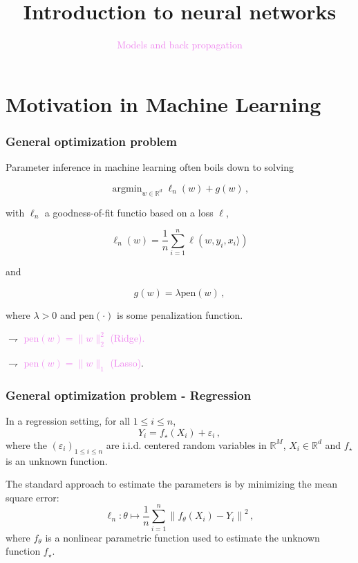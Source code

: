 \documentclass[9pt]{beamer}
\title{Introduction to neural networks}
\author{}
\date{}
\DeclareMathOperator*{\argmin}{argmin}%
\DeclareMathOperator{\pen}{pen}
\newcommand\R{\mathds{R}}
\renewcommand\pen{\textrm{pen}}
\begin{document}
\author[S. Le Corff]{\textcolor{violet}{Models and back propagation}\\ {\em {\small \textcolor{violet}{}}}}

\begin{frame}
  \titlepage
\end{frame}


 \section{Motivation in Machine Learning}


\begin{frame}
	\frametitle{General optimization problem}
	
\alert{Parameter inference in machine learning} often boils down to solving

\begin{equation*}
\argmin_{w \in \R^d} \ell_n(w) + g(w)\,,
\end{equation*}

with $\ell_n$ a \alert{goodness-of-fit functio  based on a loss $\ell$},

\begin{equation*}
\ell_n(w) = \frac 1n \sum_{i=1}^n \ell(w,y_i,  x_i \rangle)
\end{equation*}

 and

\begin{equation*}
g(w) = \lambda \pen(w)\,,
\end{equation*}

where $\lambda>0$ and \alert{$\pen(\cdot)$ is some penalization function}.


$\rightharpoondown$ \textcolor{violet}{$\pen(w) =  \|w\|_2^2$ (Ridge).}

$\rightharpoondown$ \textcolor{violet}{$\pen(w) = \|w\|_1$ (Lasso)}.


\end{frame}


\begin{frame}
	\frametitle{General optimization problem - Regression}
	
In a regression setting, for all $1\leqslant i \leqslant n$, 
$$
Y_i = f_\star(X_i) + \varepsilon_i\,,
$$
where the $(\varepsilon_i)_{1\leqslant i\leqslant n}$ are i.i.d. centered random variables in $\mathbb{R}^M$, $X_i\in\mathbb{R}^d$ and \alert{$f_{\star}$ is an unknown function}.  

\vspace{.2cm}

The standard approach to estimate the parameters is by \alert{minimizing the mean square error}:
$$
\ell_n:\theta \mapsto  \frac{1}{n} \sum_{i=1}^n\left\|f_{\theta}(X_i) - Y_i\right\|^2\,,
$$
where \alert{$f_{\theta}$ is a nonlinear parametric function} used to estimate the unknown function $f_\star$.

\end{frame}
\end{document}
